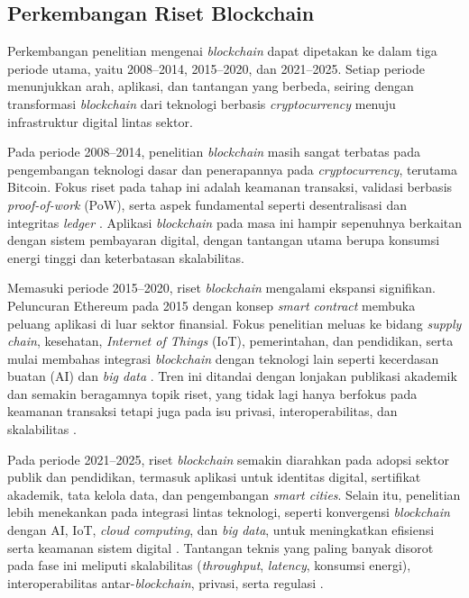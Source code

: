 \subsection{Perkembangan Riset Blockchain}

Perkembangan penelitian mengenai \textit{blockchain} dapat dipetakan ke dalam tiga periode utama, yaitu 2008--2014, 2015--2020, dan 2021--2025. Setiap periode menunjukkan arah, aplikasi, dan tantangan yang berbeda, seiring dengan transformasi \textit{blockchain} dari teknologi berbasis \textit{cryptocurrency} menuju infrastruktur digital lintas sektor.

Pada periode 2008--2014, penelitian \textit{blockchain} masih sangat terbatas pada pengembangan teknologi dasar dan penerapannya pada \textit{cryptocurrency}, terutama Bitcoin. Fokus riset pada tahap ini adalah keamanan transaksi, validasi berbasis \textit{proof-of-work} (PoW), serta aspek fundamental seperti desentralisasi dan integritas \textit{ledger} \cite{ylihuumo2016, zheng2018, yuan2018}. Aplikasi \textit{blockchain} pada masa ini hampir sepenuhnya berkaitan dengan sistem pembayaran digital, dengan tantangan utama berupa konsumsi energi tinggi dan keterbatasan skalabilitas.

Memasuki periode 2015--2020, riset \textit{blockchain} mengalami ekspansi signifikan. Peluncuran Ethereum pada 2015 dengan konsep \textit{smart contract} membuka peluang aplikasi di luar sektor finansial. Fokus penelitian meluas ke bidang \textit{supply chain}, kesehatan, \textit{Internet of Things} (IoT), pemerintahan, dan pendidikan, serta mulai membahas integrasi \textit{blockchain} dengan teknologi lain seperti kecerdasan buatan (AI) dan \textit{big data} \cite{casino2019, monrat2019, bhutta2021, salah2019, deepa2022, dutta2020, wang2019}. Tren ini ditandai dengan lonjakan publikasi akademik dan semakin beragamnya topik riset, yang tidak lagi hanya berfokus pada keamanan transaksi tetapi juga pada isu privasi, interoperabilitas, dan skalabilitas \cite{dutta2020, wang2019}.

Pada periode 2021--2025, riset \textit{blockchain} semakin diarahkan pada adopsi sektor publik dan pendidikan, termasuk aplikasi untuk identitas digital, sertifikat akademik, tata kelola data, dan pengembangan \textit{smart cities}. Selain itu, penelitian lebih menekankan pada integrasi lintas teknologi, seperti konvergensi \textit{blockchain} dengan AI, IoT, \textit{cloud computing}, dan \textit{big data}, untuk meningkatkan efisiensi serta keamanan sistem digital \cite{sunny2022, gad2022, abdelmaboud2022, bhushan2020}. Tantangan teknis yang paling banyak disorot pada fase ini meliputi skalabilitas (\textit{throughput}, \textit{latency}, konsumsi energi), interoperabilitas antar-\textit{blockchain}, privasi, serta regulasi \cite{rao2024, kolb2020, mohanta2019, habib2022}.

